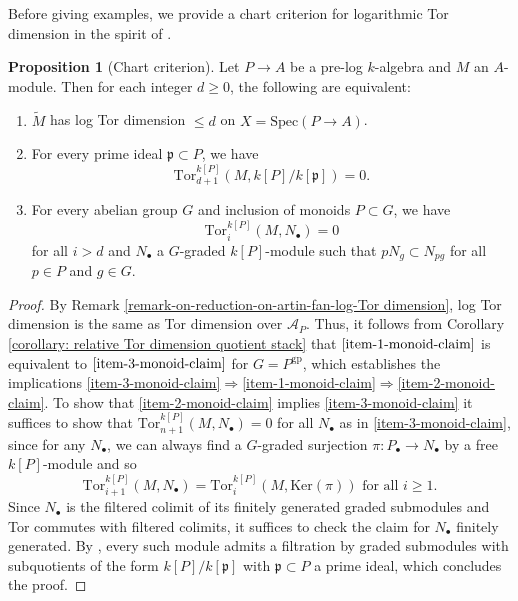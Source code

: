 \documentclass[11pt]{amsart}
\theoremstyle{definition}
\theoremstyle{definition}
\newtheorem{proposition}[theorem]{Proposition}
\begin{document}
Before giving examples, we provide a chart criterion for logarithmic Tor dimension in the spirit of \cite{gillam2016logarithmicflatness,Logarithmic-structures-of-Fontaine-Illuie-I-Kato}.

\begin{proposition}[Chart criterion]\label{statement-monoid-static}
Let $P\rightarrow A$ be a pre-log $k$-algebra and $M$ an $A$-module. Then for each integer $d\geq 0$, the following are equivalent:
\begin{enumerate}
    \item\label{item-1-monoid-claim} $\widetilde{ M}$ has log Tor dimension $\leq d$ on $X=\text{Spec}(P\rightarrow A)$. 
    \item\label{item-2-monoid-claim} For every prime ideal $\mathfrak{p}\subset P$, we have \[\text{Tor}_{d+1}^{k[P]}(M,k[P]/k[\mathfrak{p}])=0.\]
    \item\label{item-3-monoid-claim} For every abelian group $G$ and inclusion of monoids $ P\subset G$, we have
   \[\text{Tor}_{i}^{k[P]}(M,N_{\bullet})=0\]
    for all $i> d$ and $N_{\bullet}$ a $G$-graded $k[P]$-module such that $pN_{g}\subset N_{pg}$ for all $p\in P$ and $g\in G$.
\end{enumerate}
\end{proposition}
\begin{proof}
By Remark \ref{remark-on-reduction-on-artin-fan-log-Tor dimension}, log Tor dimension is the same as Tor dimension over $\mathcal{A}_{P}$. Thus, it follows from Corollary \ref{corollary: relative Tor dimension quotient stack} that $\eqref{item-1-monoid-claim}$ is equivalent to $\eqref{item-3-monoid-claim}$ for $G=P^{\text{gp}}$, which establishes the implications \eqref{item-3-monoid-claim}$\Rightarrow$\eqref{item-1-monoid-claim}$\Rightarrow$\eqref{item-2-monoid-claim}. To show that \eqref{item-2-monoid-claim} implies \eqref{item-3-monoid-claim} it suffices to show that $\text{Tor}_{n+1}^{k[P]}(M,N_{\bullet})=0$ for all $N_{\bullet}$ as in \eqref{item-3-monoid-claim}, since for any $N_{\bullet}$, we can always find a $G$-graded surjection $\pi\colon P_{\bullet}\rightarrow N_{\bullet}$ by a free $k[P]$-module and so 
\[\text{Tor}^{k[P]}_{i+1}(M,N_{\bullet})=\text{Tor}_{i}^{k[P]}(M,\text{Ker}(\pi))\text{ for all }i\geq 1.\]
Since $N_{\bullet}$ is the filtered colimit of its finitely generated graded submodules and Tor commutes with filtered colimits, it suffices to check the claim for $N_{\bullet}$ finitely generated. By \cite[Exercise 3.5 (b)]{eisenbud2013commutative}, every such module admits a filtration by graded submodules with subquotients of the form $k[P]/k[\mathfrak{p}]$ with $\mathfrak{p}\subset P$ a prime ideal, which concludes the proof.
\end{proof}
\end{document}
